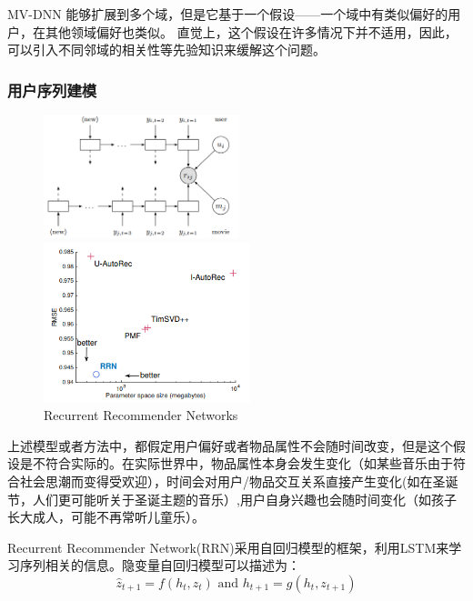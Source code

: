 MV-DNN 能够扩展到多个域，但是它基于一个假设——一个域中有类似偏好的用户，在其他领域偏好也类似。 直觉上，这个假设在许多情况下并不适用，因此，可以引入不同邻域的相关性等先验知识来缓解这个问题。


\subsubsection{用户序列建模}
\begin{figure}
\begin{center}
\begin{minipage}[t]{5.7cm}
\includegraphics[width=5.7cm]{MusicRecomSurvey/pics/rrnb.png}
\end{minipage}
\hspace{1cm}
\begin{minipage}[t]{6.0cm}
\includegraphics[width=6.0cm]{MusicRecomSurvey/pics/result.png}
\end{minipage}
\caption{Recurrent Recommender Networks}
\label{fig:rrn}
\end{center}
\end{figure}
上述模型或者方法中，都假定用户偏好或者物品属性不会随时间改变，但是这个假设是不符合实际的。在实际世界中，物品属性本身会发生变化（如某些音乐由于符合社会思潮而变得受欢迎），时间会对用户/物品交互关系直接产生变化(如在圣诞节，人们更可能听关于圣诞主题的音乐）,用户自身兴趣也会随时间变化（如孩子长大成人，可能不再常听儿童乐）。

Recurrent Recommender Network(RRN)\cite{wu2017recurrent}采用自回归模型的框架，利用LSTM来学习序列相关的信息。隐变量自回归模型可以描述为：
\begin{equation}
\hat{z}_{t+1}=f\left(h_{t}, z_{t}\right) \text { and } h_{t+1}=g\left(h_{t}, z_{t+1}\right)
\end{equation}

